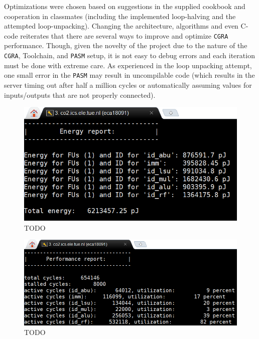 \documentclass[letterpaper, 10 pt, conference]{ieeeconf}  %
\begin{document}
Optimizations were chosen based on suggestions in the supplied cookbook and cooperation in classmates (including the implemented loop-halving and the attempted loop-unpacking). Changing the architecture, algorithms and even C-code reiterates that there are several ways to improve and optimize \texttt{CGRA} performance. Though, given the novelty of the project due to the nature of the \texttt{CGRA}, Toolchain, and \texttt{PASM} setup, it is not easy to debug errors and each iteration must be done with extreme care. As experienced in the loop unpacking attempt, one small error in the \texttt{PASM} may result in uncompilable code (which results in the server timing out after half a million cycles or automatically assuming values for inputs/outputs that are not properly connected).



\begin{figure}[h]
\begin{center}
\includegraphics[scale=0.35]{images/O101.png}
\caption{TODO}
\label{fig:TODO3}
\end{center}
\end{figure}

\begin{figure}[h]
\begin{center}
\includegraphics[scale=0.35]{images/O102.png}
\caption{TODO}
\label{fig:TODO4}
\end{center}
\end{figure}
\end{document}
